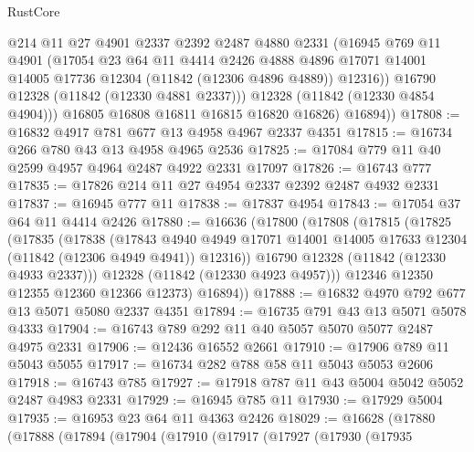 \begin{lexlean}{RustCore}
\begin{coremodule}
              @214
              @11
              @27
              @4901
              @2337
              @2392
              @2487
              @4880
              @2331
              (@16945
                @769
                @11
                @4901
                (@17054
                  @23
                  @64
                  @11
                  @4414
                  @2426
                  @4888
                  @4896
                  @17071
                  @14001
                  @14005
                  @17736
                  @12304
                  (@11842 (@12306 @4896 @4889))
                  @12316))
              @16790
              @12328
              (@11842 (@12330 @4881 @2337)))
            @12328
            (@11842 (@12330 @4854 @4904)))
          @16805
          @16808
          @16811
          @16815
          @16820
          @16826)
        @16894))
@17808 := @16832 @4917 @781 @677 @13 @4958 @4967 @2337 @4351
@17815 := @16734 @266 @780 @43 @13 @4958 @4965 @2536
@17825 := @17084 @779 @11 @40 @2599 @4957 @4964 @2487 @4922 @2331 @17097
@17826 := @16743 @777
@17835 := @17826 @214 @11 @27 @4954 @2337 @2392 @2487 @4932 @2331
@17837 := @16945 @777 @11
@17838 := @17837 @4954
@17843 := @17054 @37 @64 @11 @4414 @2426
@17880 := @16636
    (@17800
      (@17808
        (@17815
          (@17825
            (@17835
              (@17838
                (@17843
                  @4940
                  @4949
                  @17071
                  @14001
                  @14005
                  @17633
                  @12304
                  (@11842 (@12306 @4949 @4941))
                  @12316))
              @16790
              @12328
              (@11842 (@12330 @4933 @2337)))
            @12328
            (@11842 (@12330 @4923 @4957)))
          @12346
          @12350
          @12355
          @12360
          @12366
          @12373)
        @16894))
@17888 := @16832 @4970 @792 @677 @13 @5071 @5080 @2337 @4351
@17894 := @16735 @791 @43 @13 @5071 @5078 @4333
@17904 := @16743 @789 @292 @11 @40 @5057 @5070 @5077 @2487 @4975 @2331
@17906 := @12436 @16552 @2661
@17910 := @17906 @789 @11 @5043 @5055
@17917 := @16734 @282 @788 @58 @11 @5043 @5053 @2606
@17918 := @16743 @785
@17927 := @17918 @787 @11 @43 @5004 @5042 @5052 @2487 @4983 @2331
@17929 := @16945 @785 @11
@17930 := @17929 @5004
@17935 := @16953 @23 @64 @11 @4363 @2426
@18029 := @16628
    (@17880
      (@17888
        (@17894
          (@17904
            (@17910
              (@17917
                (@17927
                  (@17930
                    (@17935

\end{coremodule}
\end{lexlean}
